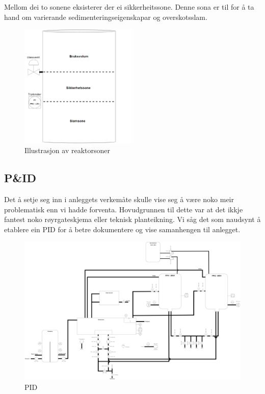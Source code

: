 Mellom dei to sonene eksisterer der ei sikkerheitssone.
Denne sona er til for å ta hand om varierande sedimenteringseigenskapar
og overskotsslam.\newline

\begin{figure}[htbp]
    \centering
    \includegraphics[width=0.5\textwidth]{Figurar/Reaktorsoner.png}
    \caption{Illustrasjon av reaktorsoner}\label{fig:Reaktorsonar}
\end{figure}

\subsection{P\&ID}

Det å setje seg inn i anleggets verkemåte skulle vise seg å være noko meir problematisk enn vi hadde forventa.
Hovudgrunnen til dette var at det ikkje fantest noko røyrgateskjema eller teknisk planteikning.
Vi såg det som naudsynt å etablere ein \gls{PID} for å betre dokumentere og vise samanhengen til anlegget.

\begin{figure}[htbp]
    \centering
    \includegraphics[angle=90,width=1\textwidth]{Figurar/PID.drawio.png}
    \caption{\gls{PID}}\label{fig:HMI}
\end{figure}